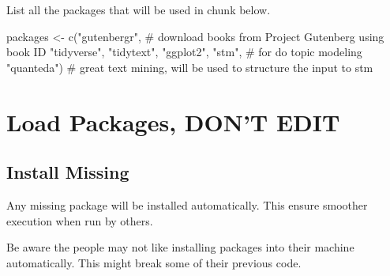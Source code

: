 \documentclass[
  letterpaper,
  DIV=11,
  numbers=noendperiod]{scrreprt}
\newenvironment{Shaded}{\begin{snugshade}}{\end{snugshade}}
\newcommand{\CommentTok}[1]{\textcolor[rgb]{0.37,0.37,0.37}{#1}}
\newcommand{\FunctionTok}[1]{\textcolor[rgb]{0.28,0.35,0.67}{#1}}
\newcommand{\NormalTok}[1]{\textcolor[rgb]{0.00,0.23,0.31}{#1}}
\newcommand{\OtherTok}[1]{\textcolor[rgb]{0.00,0.23,0.31}{#1}}
\newcommand{\StringTok}[1]{\textcolor[rgb]{0.13,0.47,0.30}{#1}}
\begin{document}

List all the packages that will be used in chunk below.

\begin{Shaded}
\begin{Highlighting}[]
\NormalTok{packages }\OtherTok{\textless{}{-}} \FunctionTok{c}\NormalTok{(}\StringTok{"gutenbergr"}\NormalTok{, }\CommentTok{\# download books from Project Gutenberg using book ID}
              \StringTok{"tidyverse"}\NormalTok{,}
              \StringTok{"tidytext"}\NormalTok{,}
              \StringTok{"ggplot2"}\NormalTok{,}
              \StringTok{"stm"}\NormalTok{, }\CommentTok{\# for do topic modeling}
              \StringTok{"quanteda"}\NormalTok{) }\CommentTok{\# great text mining, will be used to structure the input to stm}
\end{Highlighting}
\end{Shaded}

\section*{Load Packages, DON'T EDIT}\label{sec-packages}


\subsection*{Install Missing}\label{install-missing-9}

Any missing package will be installed automatically. This ensure
smoother execution when run by others.

\begin{tcolorbox}[enhanced jigsaw, titlerule=0mm, left=2mm, breakable, coltitle=black, colbacktitle=quarto-callout-important-color!10!white, opacityback=0, opacitybacktitle=0.6, colback=white, rightrule=.15mm, title=\textcolor{quarto-callout-important-color}{\faExclamation}\hspace{0.5em}{Installing Packages on Other People Machine}, colframe=quarto-callout-important-color-frame, leftrule=.75mm, bottomtitle=1mm, toptitle=1mm, bottomrule=.15mm, arc=.35mm, toprule=.15mm]

Be aware the people may not like installing packages into their machine
automatically. This might break some of their previous code.

\end{tcolorbox}
\end{document}
